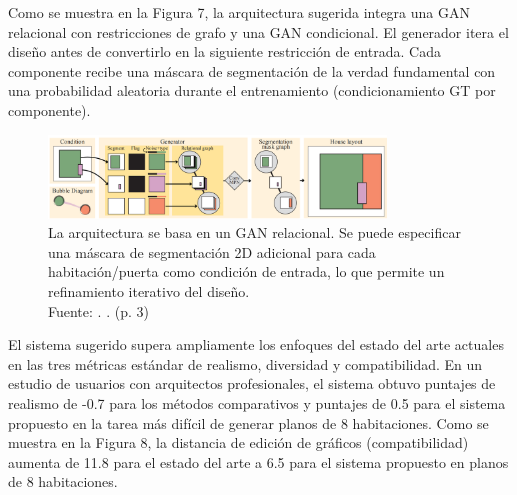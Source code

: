 Como se muestra en la Figura 7, la arquitectura sugerida integra una GAN relacional con restricciones de grafo y una GAN condicional. El generador itera el diseño antes de convertirlo en la siguiente restricción de entrada. Cada componente recibe una máscara de segmentación de la verdad fundamental con una probabilidad aleatoria durante el entrenamiento (condicionamiento GT por componente).

\begin{figure}[!ht]
	\begin{center}
		\includegraphics[width=0.8\textwidth]{2/figures/nauata2021.png}
		\caption[La arquitectura se basa en un GAN relacional. Se puede especificar una máscara de segmentación 2D adicional para cada habitación/puerta como condición de entrada, lo que permite un refinamiento iterativo del diseño.]{La arquitectura se basa en un GAN relacional. Se puede especificar una máscara de segmentación 2D adicional para cada habitación/puerta como condición de entrada, lo que permite un refinamiento iterativo del diseño.\\
		Fuente: \cite{pr_nauata2021housegan}. . (p. 3)}
		\label{2:fig115}
	\end{center}
\end{figure}

El sistema sugerido supera ampliamente los enfoques del estado del arte actuales en las tres métricas estándar de realismo, diversidad y compatibilidad. En un estudio de usuarios con arquitectos profesionales, el sistema obtuvo puntajes de realismo de -0.7 para los métodos comparativos y puntajes de 0.5 para el sistema propuesto en la tarea más difícil de generar planos de 8 habitaciones. Como se muestra en la Figura 8, la distancia de edición de gráficos (compatibilidad) aumenta de 11.8 para el estado del arte a 6.5 para el sistema propuesto en planos de 8 habitaciones.

